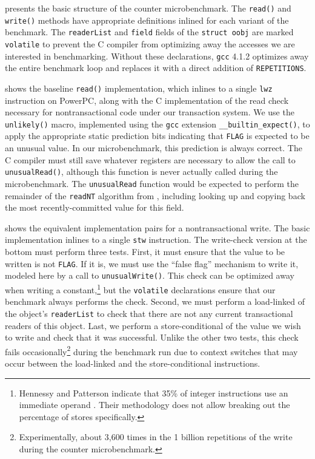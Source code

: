  presents the basic structure of the counter
microbenchmark. The \texttt{read()} and \texttt{write()} methods
have appropriate definitions inlined for each variant of the
benchmark.  The \texttt{readerList} and \texttt{field}
fields of the \texttt{struct oobj} are marked \texttt{volatile} to
prevent the C compiler from optimizing away the accesses we are
interested in benchmarking.  Without these declarations, \texttt{gcc}
4.1.2 optimizes away the entire benchmark loop and replaces it with
a direct addition of \texttt{REPETITIONS}\@.

 shows the baseline \texttt{read()}
implementation, which inlines to a single \texttt{lwz} instruction on
PowerPC, along with the C implementation of the read check necessary
for nontransactional code under our transaction system.  We use 
the \texttt{unlikely()} macro, implemented using the
\texttt{gcc} extension \texttt{\_\_builtin\_expect()}, to apply the
appropriate static prediction bits indicating that \texttt{FLAG} is
expected to be an unusual value.  In our microbenchmark, this
prediction is always correct.  The C compiler must still save
whatever registers are necessary to allow the call to
\texttt{unusualRead()}, although this function is never actually called
during the microbenchmark.  The \texttt{unusualRead} function would be
expected to perform the remainder of the \texttt{readNT} algorithm
from , including looking up and copying back the most
recently-committed value for this field.

 shows the equivalent implementation pairs for a
nontransactional write.  The basic implementation inlines to a single
\texttt{stw} instruction.  The write-check version at the bottom must
perform three tests.  First, it must ensure that the value to be
written is not \texttt{FLAG}\@.  If it is, we must use the ``false flag''
mechanism to write it, modeled here by a call to
\texttt{unusualWrite()}.  This check can be optimized away when
writing a constant,\footnote{Hennessy and Patterson indicate that 35\%
  of integer instructions use an immediate operand \cite[p. 78]{HennessyPa96}.
  Their methodology does not
  allow breaking out the percentage of stores specifically.}
 but the \texttt{volatile} declarations ensure that
our benchmark always performs the check.  Second, we must perform
a load-linked of the object's \texttt{readerList} to check that there
are not any current transactional readers of this object.  Last, we
perform a store-conditional of the value we wish to write and check
that it was successful.  Unlike the other two tests, this check
fails occasionally\footnote{Experimentally, about 3,600 times in
  the 1 billion repetitions of the write during the counter microbenchmark.}
 during the benchmark run due to context switches
that may occur between the load-linked and the store-conditional
instructions.

